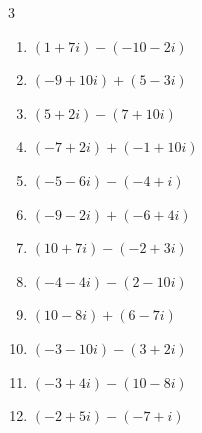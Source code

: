 \begin{multicols}{3}
\begin{enumerate}
        \phantom{$\displaystyle =8-17i$}

  \item $\displaystyle (1+7i) - (-10-2i)$

        \phantom{$\displaystyle =11+9i$}

  \item $\displaystyle (-9+10i) + (5-3i)$

        \phantom{$\displaystyle =-4+7i$}

  \item $\displaystyle (5+2i) - (7+10i)$

        \phantom{$\displaystyle =-2-8i$}

\columnbreak %

  \item $\displaystyle (-7+2i) + (-1+10i)$

        \phantom{$\displaystyle =-8+12i$}

  \item $\displaystyle (-5-6i) - (-4+i)$

        \phantom{$\displaystyle =-1-7i$}

  \item $\displaystyle (-9-2i) + (-6+4i)$

        \phantom{$\displaystyle =-15+2i$}

  \item $\displaystyle (10+7i) - (-2+3i)$

        \phantom{$\displaystyle =12+4i$}

  \item $\displaystyle (-4-4i) - (2-10i)$

        \phantom{$\displaystyle =-6+6i$}

  \item $\displaystyle (10-8i) + (6-7i)$

        \phantom{$\displaystyle =16-15i$}

  \item $\displaystyle (-3-10i) - (3+2i)$

        \phantom{$\displaystyle =-6-12i$}

  \item $\displaystyle (-3+4i) - (10-8i)$

        \phantom{$\displaystyle =-13+12i$}

  \item $\displaystyle (-2+5i) - (-7+i)$

        \phantom{$\displaystyle =5+4i$}


\end{enumerate}
\end{multicols}
